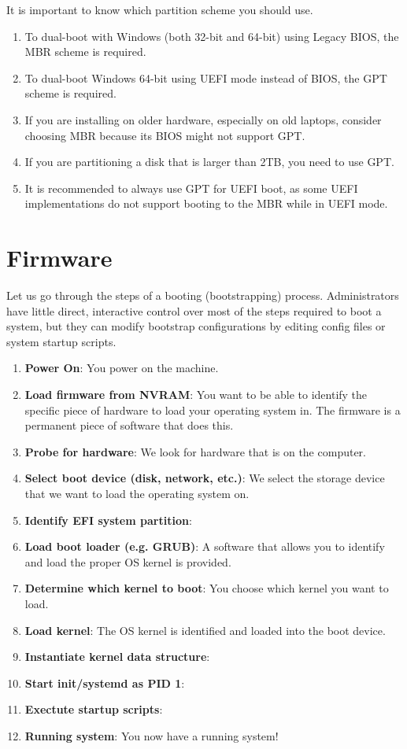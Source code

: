 \documentclass{article}
\begin{document}
    It is important to know which partition scheme you should use. 
    \begin{enumerate} 
      \item To dual-boot with Windows (both 32-bit and 64-bit) using Legacy BIOS, the MBR scheme is required.
      \item To dual-boot Windows 64-bit using UEFI mode instead of BIOS, the GPT scheme is required.
      \item If you are installing on older hardware, especially on old laptops, consider choosing MBR because its BIOS might not support GPT.
      \item If you are partitioning a disk that is larger than 2TB, you need to use GPT.
      \item It is recommended to always use GPT for UEFI boot, as some UEFI implementations do not support booting to the MBR while in UEFI mode.
    \end{enumerate}

\section{Firmware} 

    Let us go through the steps of a booting (bootstrapping) process. Administrators have little direct, interactive control over most of the steps required to boot a system, but they can modify bootstrap configurations by editing config files or system startup scripts. 

    \begin{enumerate}
      \item \textbf{Power On}: You power on the machine. 
      \item \textbf{Load firmware from NVRAM}: You want to be able to identify the specific piece of hardware to load your operating system in. The firmware is a permanent piece of software that does this. 
      \item \textbf{Probe for hardware}: We look for hardware that is on the computer. 
      \item \textbf{Select boot device (disk, network, etc.)}: We select the storage device that we want to load the operating system on. 
      \item \textbf{Identify EFI system partition}: 
      \item \textbf{Load boot loader (e.g. GRUB)}: A software that allows you to identify and load the proper OS kernel is provided. 
      \item \textbf{Determine which kernel to boot}: You choose which kernel you want to load.  
      \item \textbf{Load kernel}: The OS kernel is identified and loaded into the boot device. 
      \item \textbf{Instantiate kernel data structure}: 
      \item \textbf{Start init/systemd as PID 1}: 
      \item \textbf{Exectute startup scripts}:
      \item \textbf{Running system}: You now have a running system! 
    \end{enumerate}
\end{document}
